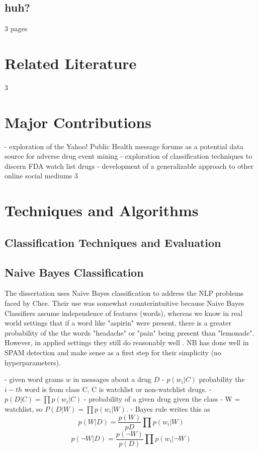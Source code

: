 \documentclass[twoside,11pt]{article}
\begin{document}
\subsection{huh?}


3 pages




\section{Related Literature}
3


\section{Major Contributions}
- exploration of the Yahoo! Public Health message forums as a potential data source
for adverse drug event mining
- exploration of classification techniques to discern FDA watch list drugs
- development of a generalizable approach to other online social mediums
3

\section{Techniques and Algorithms}

\subsection{Classification Techniques and Evaluation}



\subsection{Naive Bayes Classification}
The dissertation uses Naive Bayes classification to address the NLP problems
faced by Chee.  Their use was somewhat counterintuitive because Naive Bayes
Classifiers assume independence of features (words), whereas we know in real world settings
that if a word like "aspirin" were present, there is a greater probability of the
the words "headache" or "pain" being present than "lemonade". However, in
applied settings they still do reasonably well \citep{Manning, 1999}. NB has done well
in SPAM detection \citep{Sahami} and make sense as a first step for their simplicity (no
hyperparameters).

- given word grams $w$ in messages about a drug $D$
- $p(w_{i}|C)$ probability the $i-th$ word is from class C, C is watchlist or
non-watchlist drugs.
- $p(D|C) = \prod p(w_{i}|C)$ - probability of a given drug given the class
- W = watchlist, so $P(D|W) = \prod p(w_{i}|W)$.
- Bayes rule writes this as
\[
  p(W|D) = \frac{p(W)}{p{D}} \prod p(w_{i}|W)
\]
\[
  p(\neg{W}|D) = \frac{p(\neg{W})}{p(D)} \prod p(w_{i}|\neg{W})
\]
\end{document}
